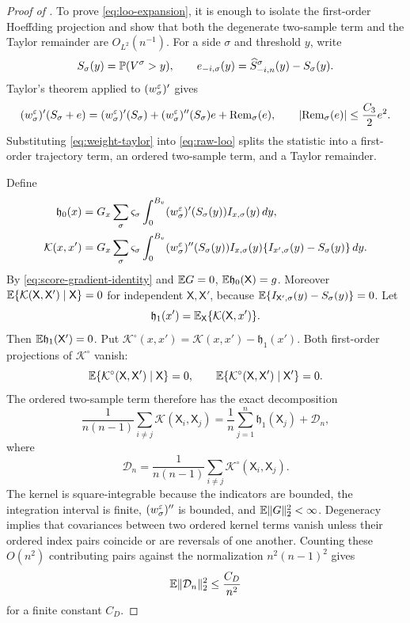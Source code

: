 \begin{proof}[Proof of ]
To prove \eqref{eq:loo-expansion}, it is enough to isolate the first-order Hoeffding projection and show that both the degenerate two-sample term and the Taylor remainder are $O_{L^2}(n^{-1})$.  For a side $\sigma$ and threshold $y$, write
\[
 S_\sigma(y)=\mathbb P(V^\sigma>y),
 \qquad
 e_{-i,\sigma}(y)=\widehat S_{-i,n}^\sigma(y)-S_\sigma(y).
\]
Taylor's theorem applied to $(w_\sigma^\varepsilon)'$ gives
\begin{equation}\label{eq:weight-taylor}
 (w_\sigma^\varepsilon)'(S_\sigma+e)
 =(w_\sigma^\varepsilon)'(S_\sigma)
 +(w_\sigma^\varepsilon)''(S_\sigma)e
 +\operatorname{Rem}_\sigma(e),
 \qquad
 \lvert\operatorname{Rem}_\sigma(e)\rvert\le\frac{C_3}{2}e^2.
\end{equation}
Substituting \eqref{eq:weight-taylor} into \eqref{eq:raw-loo} splits the statistic into a first-order trajectory term, an ordered two-sample term, and a Taylor remainder.

Define
\begin{align*}
 \mathfrak h_0(x)
 &=G_x\sum_\sigma \varsigma_\sigma
 \int_0^{B_v}(w_\sigma^\varepsilon)'(S_\sigma(y))I_{x,\sigma}(y)\,dy,\\
 \mathcal K(x,x')
 &=G_x\sum_\sigma \varsigma_\sigma
 \int_0^{B_v}(w_\sigma^\varepsilon)''(S_\sigma(y))
 I_{x,\sigma}(y)\{I_{x',\sigma}(y)-S_\sigma(y)\}\,dy.
\end{align*}
By \eqref{eq:score-gradient-identity} and $\mathbb E G=0$, $\mathbb E \mathfrak h_0(\mathsf X)=g$.  Moreover
$\mathbb E\{\mathcal K(\mathsf X,\mathsf X')\mid \mathsf X\}=0$ for independent $\mathsf X,\mathsf X'$, because
$\mathbb E\{I_{\mathsf X',\sigma}(y)-S_\sigma(y)\}=0$.  Let
\[
 \mathfrak h_1(x')=\mathbb E_{\mathsf X}\{\mathcal K(\mathsf X,x')\}.
\]
Then $\mathbb E \mathfrak h_1(\mathsf X')=0$.  Put
$\mathcal K^\circ(x,x')=\mathcal K(x,x')-\mathfrak h_1(x')$.  Both first-order projections of $\mathcal K^\circ$ vanish:
\[
 \mathbb E\{\mathcal K^\circ(\mathsf X,\mathsf X')\mid \mathsf X\}=0,
 \qquad
 \mathbb E\{\mathcal K^\circ(\mathsf X,\mathsf X')\mid \mathsf X'\}=0.
\]
The ordered two-sample term therefore has the exact decomposition
\begin{equation}\label{eq:ordered-hoeffding}
 \frac{1}{n(n-1)}\sum_{i\ne j}\mathcal K(\mathsf X_i,\mathsf X_j)
 =\frac1n\sum_{j=1}^{n}\mathfrak h_1(\mathsf X_j)
 +\mathcal D_n,
\end{equation}
where
\[
 \mathcal D_n=\frac{1}{n(n-1)}\sum_{i\ne j}\mathcal K^\circ(\mathsf X_i,\mathsf X_j).
\]
The kernel is square-integrable because the indicators are bounded, the integration interval is finite, $(w_\sigma^\varepsilon)''$ is bounded, and $\mathbb E\lVert G\rVert_2^2<\infty$.  Degeneracy implies that covariances between two ordered kernel terms vanish unless their ordered index pairs coincide or are reversals of one another.  Counting these $O(n^2)$ contributing pairs against the normalization $n^2(n-1)^2$ gives
\begin{equation}\label{eq:degenerate-remainder}
 \mathbb E\lVert\mathcal D_n\rVert_2^2\le\frac{C_D}{n^2}
\end{equation}
for a finite constant $C_D$.


\end{proof}
